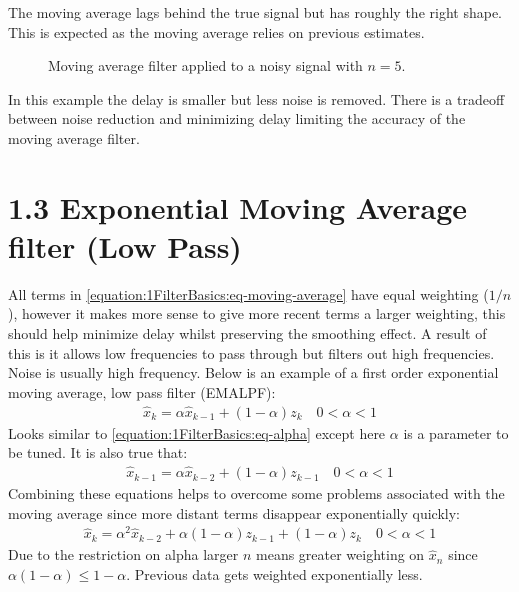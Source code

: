 \documentclass[letterpaper,10pt,english]{jupyterBook}
\begin{document}
\sphinxAtStartPar
The moving average lags behind the true signal but has roughly the right shape. This is expected as the moving average relies on previous estimates.

\begin{figure}[htbp]
\centering
\capstart

\noindent{}
\caption{Moving average filter applied to a noisy signal with \(n=5\).}\label{\detokenize{1FilterBasics:fig-moving-average-k5}}\end{figure}

\sphinxAtStartPar
In this example the delay is smaller but less noise is removed. There is a tradeoff between noise reduction and minimizing delay limiting the accuracy of the moving average filter.


\section{1.3 Exponential Moving Average filter (Low Pass)}
\label{\detokenize{1FilterBasics:exponential-moving-average-filter-low-pass}}
\sphinxAtStartPar
All terms in \eqref{equation:1FilterBasics:eq-moving-average} have equal weighting (\(1/n\)), however it makes more sense to give more recent terms a larger weighting, this should help minimize delay whilst preserving the smoothing effect. A result of this is it allows low frequencies to pass through but filters out high frequencies. Noise is usually high frequency. Below is an example of a first order exponential moving average, low pass filter (EMALPF):
\begin{equation}\label{equation:1FilterBasics:eq-lowpass-1}
\begin{split}\hat{x}_k = \alpha \hat{x}_{k-1} + (1 - \alpha) z_k \quad 0<\alpha<1\end{split}
\end{equation}
\sphinxAtStartPar
Looks similar to \eqref{equation:1FilterBasics:eq-alpha} except here \(\alpha\) is a parameter to be tuned. It is also true that:
\begin{equation}\label{equation:1FilterBasics:eq-lowpass-2}
\begin{split}\hat{x}_{k-1} = \alpha \hat{x}_{k-2} + (1 - \alpha) z_{k-1} \quad 0<\alpha<1\end{split}
\end{equation}
\sphinxAtStartPar
Combining these equations helps to overcome some problems associated with the moving average since more distant terms disappear exponentially quickly:
\begin{equation}\label{equation:1FilterBasics:eq-lowpass-3}
\begin{split}\hat{x}_k = \alpha^2 \hat{x}_{k-2} + \alpha(1-\alpha) z_{k-1} + (1-\alpha)z_k \quad 0<\alpha<1\end{split}
\end{equation}
\sphinxAtStartPar
Due to the restriction on alpha larger \(n\) means greater weighting on \(\hat{x}_n\) since \(\alpha(1-\alpha)\leq 1-\alpha\). Previous data gets weighted exponentially less.
\end{document}
